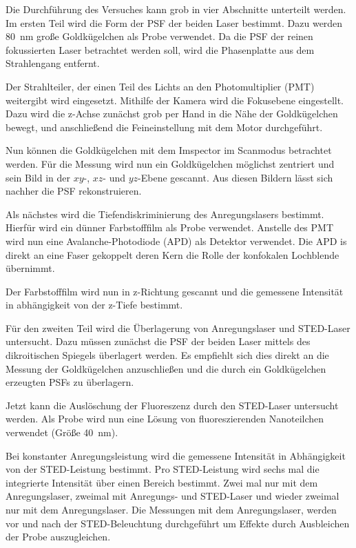 Die Durchführung des Versuches kann grob in vier Abschnitte unterteilt werden.
Im ersten Teil wird die Form der PSF der beiden Laser bestimmt.
Dazu werden 80~nm große Goldkügelchen als Probe verwendet.
Da die PSF der reinen fokussierten Laser betrachtet werden soll, wird die Phasenplatte aus dem Strahlengang entfernt.

Der Strahlteiler, der einen Teil des Lichts an den Photomultiplier (PMT) weitergibt wird eingesetzt.
Mithilfe der Kamera wird die Fokusebene eingestellt.
Dazu wird die z-Achse zunächst grob per Hand in die Nähe der Goldkügelchen bewegt, und anschließend die Feineinstellung mit dem Motor durchgeführt.

Nun können die Goldkügelchen mit dem Imspector im Scanmodus betrachtet werden.
Für die Messung wird nun ein Goldkügelchen möglichst zentriert und sein Bild in der $xy$-, $xz$- und $yz$-Ebene gescannt. 
Aus diesen Bildern lässt sich nachher die PSF rekonstruieren.

Als nächstes wird die Tiefendiskriminierung des Anregungslasers bestimmt.
Hierfür wird ein dünner Farbstofffilm als Probe verwendet.
Anstelle des PMT wird nun eine Avalanche-Photodiode (APD) als Detektor verwendet.
Die APD is direkt an eine Faser gekoppelt deren Kern die Rolle der konfokalen Lochblende übernimmt.

Der Farbstofffilm wird nun in z-Richtung gescannt und die gemessene Intensität in abhängigkeit von der z-Tiefe bestimmt.

Für den zweiten Teil wird die Überlagerung von Anregungslaser und STED-Laser untersucht.
Dazu müssen zunächst die PSF der beiden Laser mittels des dikroitischen Spiegels überlagert werden.
Es empfiehlt sich dies direkt an die Messung der Goldkügelchen anzuschließen und die durch ein Goldkügelchen erzeugten PSFs zu überlagern.

Jetzt kann die Auslöschung der Fluoreszenz durch den STED-Laser untersucht werden. 
Als Probe wird nun eine Lösung von fluoreszierenden Nanoteilchen verwendet (Größe 40~nm).

Bei konstanter Anregungsleistung wird die gemessene Intensität in Abhängigkeit von der STED-Leistung bestimmt.
Pro STED-Leistung wird sechs mal die integrierte Intensität über einen Bereich bestimmt. Zwei mal nur mit dem Anregungslaser, zweimal mit Anregungs- und STED-Laser und wieder zweimal nur mit dem Anregungslaser.
Die Messungen mit dem Anregungslaser, werden vor und nach der STED-Beleuchtung durchgeführt um Effekte durch Ausbleichen der Probe auszugleichen.

